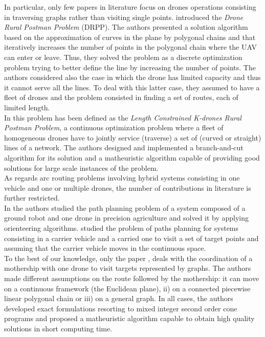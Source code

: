 \documentclass{itor}
\theoremstyle{definition}
\theoremstyle{remark}
\begin{document}
\noindent
{
In particular, only few papers in literature focus on drones operations consisting in traversing graphs rather than visiting single points.
\cite{art:Campbell2018} introduced the \textit{Drone Rural Postman Problem} (DRPP). The authors presented a solution algorithm based on the approximation of curves in the plane by polygonal chains and that iteratively increases the number of points in the polygonal chain where the UAV can enter or leave. Thus, they solved the problem as a discrete optimization problem trying to better define the line by increasing the number of points. The authors considered also the case in which the drone has limited capacity and thus it cannot serve all the lines. To deal with this latter case, they assumed to have a fleet of drones and the problem consisted in finding a set of routes, each of limited length.\\
In \cite{art:CAMPBELL202160}  this problem has been defined as the \textit{Length Constrained K-drones Rural Postman Problem}, a continuous optimization problem where a fleet of homogeneous drones have to jointly service (traverse) a set of (curved or straight) lines of a network. The authors designed and implemented a branch-and-cut algorithm for its solution and a matheuristic algorithm capable of providing good solutions for large scale instances of the problem.\\
As regards arc routing problems involving hybrid systems consisting in one vehicle and one or multiple drones, the number of contributions in literature is further restricted.\\
In \cite{art:Tokekar2016} the authors studied the path planning problem of a system composed of a ground robot and one drone in precision agriculture and solved it by applying orienteering algorithms. \cite{art:Garone2010} studied the problem of paths planning for systems consisting in a carrier vehicle and a carried one to visit a set of target points and assuming that the carrier vehicle moves in the continuous space.\\
To the best of our knowledge, only the paper \cite{art:Amorosi2021}, deals with the coordination of a mothership with one drone to visit targets represented by graphs. The authors made different assumptions on the route followed by the mothership: it can move on a continuous framework (the Euclidean plane), ii) on a connected piecewise linear polygonal chain or iii) on a general graph. In all cases, the authors developed exact formulations resorting to mixed integer second order cone programs and proposed a matheuristic algorithm capable to obtain high quality solutions in short computing time.
}
\end{document}
